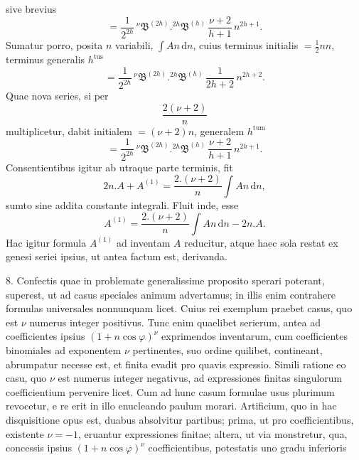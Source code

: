 \par\noindent{}%
sive brevius
\[
= \frac{1}{2^{2h}}\,{}^{\nu}\mathfrak{B}^{(2h)} .  {}^{2h}\mathfrak{B}^{(h)}\,\frac{\nu+2}{h+1}\,n^{2h+1}.
\]
Sumatur porro, posita $n$ variabili, $\int An\,\mathrm{d}n$, cuius terminus initialis $=\frac{1}{2}nn$, terminus generalis $h^{\text{tus}}$
\[
= \frac{1}{2^{2h}}\,{}^{\nu}\mathfrak{B}^{(2h)} .  {}^{2h}\mathfrak{B}^{(h)}\,\frac{1}{2h+2}\,n^{2h+2}.
\]
Quae nova series, si per
\[
\frac{2(\nu+2)}{n}
\]
multiplicetur, dabit initialem $=(\nu+2)n$, generalem $h^{\text{tum}}$
\[
= \frac{1}{2^{2h}}\,{}^{\nu}\mathfrak{B}^{(2h)} .  {}^{2h}\mathfrak{B}^{(h)}\,\frac{\nu+2}{h+1}\,n^{2h+1}.
\]
Consentientibus igitur ab utraque parte terminis, fit
\[
2n .  A + A^{(1)} = \frac{2 . (\nu+2)}{n}\int An\,\mathrm{d}n,
\]
sumto sine addita constante integrali. Fluit inde, esse
\[
A^{(1)} = \frac{2 . (\nu+2)}{n}\int An\,\mathrm{d}n - 2n .  A.
\]
\noindent\hspace*{\parindent}Hac igitur formula $A^{(1)}$ ad inventam $A$ reducitur, atque haec sola restat ex genesi seriei ipsius, ut antea factum est, derivanda.

8. Confectis quae in problemate generalissime proposito sperari poterant, superest, ut ad casus speciales animum advertamus; in illis enim contrahere formulas universales nonnunquam licet. Cuius rei exemplum praebet casus, quo est $\nu$ numerus integer positivus. Tunc enim quaelibet serierum, antea ad coefficientes ipsius $(1+n\cos\varphi)^{\nu}$ exprimendos inventarum, cum coefficientes binomiales ad exponentem $\nu$ pertinentes, suo ordine quilibet, contineant, abrumpatur necesse est, et finita evadit pro quavis expressio. Simili ratione eo casu, quo $\nu$ est numerus integer negativus, ad expressiones finitas singulorum coefficientium pervenire licet. Cum ad hunc casum formulae usus plurimum revocetur, e re erit in illo enucleando paulum morari. Artificium, quo in hac disquisitione opus est, duabus absolvitur partibus; prima, ut pro coefficientibus, existente $\nu=-1$, eruantur expressiones finitae; altera, ut via monstretur, qua, concessis ipsius $(1+n\cos\varphi)^{\nu}$ coefficientibus, potestatis uno gradu inferioris
